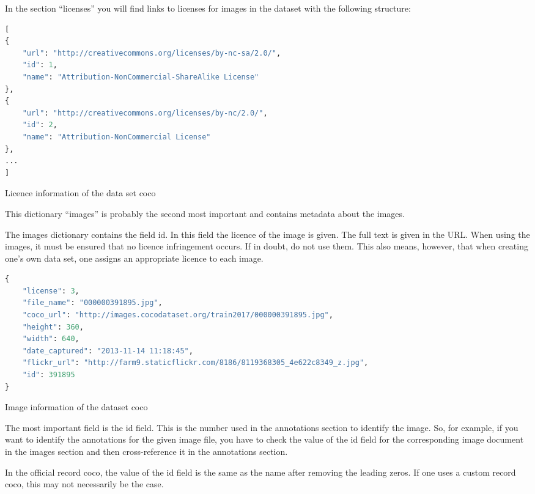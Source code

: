 \bigskip


In the section ``licenses'' you will find links to licenses for images in the dataset with the following structure:

\begin{code}
\begin{lstlisting}[language=python]
[
{
    "url": "http://creativecommons.org/licenses/by-nc-sa/2.0/", 
    "id": 1, 
    "name": "Attribution-NonCommercial-ShareAlike License"
},
{
    "url": "http://creativecommons.org/licenses/by-nc/2.0/", 
    "id": 2, 
    "name": "Attribution-NonCommercial License"
},
...
]
\end{lstlisting}
\caption{Licence information of the data set \ac{coco}}
\end{code}

\bigskip


\bigskip

This dictionary ``images'' is probably the second most important and contains metadata about the images.

The images dictionary contains the field id. In this field the licence of the image is given. The full text is given in the URL. When using the images, it must be ensured that no licence infringement occurs. If in doubt, do not use them. This also means, however, that when creating one's own data set, one assigns an appropriate licence to each image. 


\begin{code}
\begin{lstlisting}[language=python]
{
    "license": 3,
    "file_name": "000000391895.jpg",
    "coco_url": "http://images.cocodataset.org/train2017/000000391895.jpg",
    "height": 360,
    "width": 640,
    "date_captured": "2013-11-14 11:18:45",
    "flickr_url": "http://farm9.staticflickr.com/8186/8119368305_4e622c8349_z.jpg",
    "id": 391895
}
\end{lstlisting}
\caption{Image information of the dataset \ac{coco}}
\end{code}


The most important field is the id field. This is the number used in the annotations section to identify the image. So, for example, if you want to identify the annotations for the given image file, you have to check the value of the id field for the corresponding image document in the images section and then cross-reference it in the annotations section.

In the official record \ac{coco}, the value of the id field is the same as the name  after removing the leading zeros. If one uses a custom record \ac{coco}, this may not necessarily be the case. 



